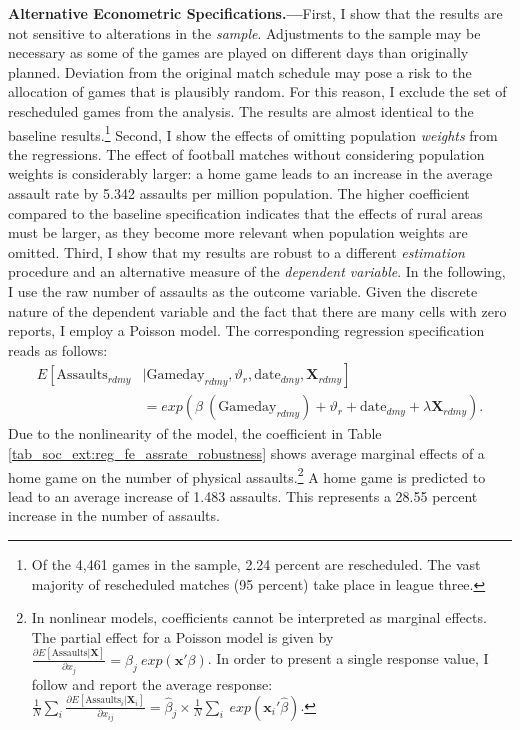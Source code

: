\textbf{Alternative Econometric Specifications.---}First, I show that the results are not sensitive to alterations in the \textit{sample}. Adjustments to the sample may be necessary as some of the games are played on different days than originally planned. Deviation from the original match schedule may pose a risk to the allocation of games that is plausibly random. For this reason, I exclude the set of rescheduled games from the analysis. The results are almost identical to the baseline results.\footnote{Of the 4,461 games in the sample, 2.24 percent are rescheduled. The vast majority of rescheduled matches (95 percent) take place in league three.} Second, I show the effects of omitting population \textit{weights} from the regressions. The effect of football matches without considering population weights is considerably larger: a home game leads to an increase in the average assault rate by 5.342 assaults per million population. The higher coefficient compared to the baseline specification indicates that the effects of rural areas must be larger, as they become more relevant when population weights are omitted. Third, I show that my results are robust to a different \textit{estimation} procedure and an alternative measure of the \textit{dependent variable}. In the following, I use the raw number of assaults as the outcome variable. Given the discrete nature of the dependent variable and the fact that there are many cells with zero reports, I employ a Poisson model. The corresponding regression specification reads as follows:
\begin{align}
E\left[ \text{Assaults}_{rdmy}\right.&|\left.\text{Gameday}_{rdmy},\vartheta_r,\text{date}_{dmy}, \mathbf{X}_{rdmy} \right] \nonumber \\ &= exp\left( \beta\ (\text{Gameday}_{rdmy}) + \vartheta_r + \text{date}_{dmy} + \lambda\mathbf{X}_{rdmy} \right). 
\label{eq_soc_ext:poisson_model}
\end{align}
Due to the nonlinearity of the model, the coefficient in Table \ref{tab_soc_ext:reg_fe_assrate_robustness} shows average marginal effects of a home game on the number of physical assaults.\footnote{In nonlinear models, coefficients cannot be interpreted as marginal effects. The partial effect for a Poisson model is given by $\frac{\partial E\left[ \text{Assaults}| \mathbf{X}\right]}{\partial x_j} = \beta_j\ exp(\mathbf{x'}\beta)$. In order to present a single response value, I follow \cite{cameron2005microeconometrics} and report the average response: $\frac{1}{N}\sum_i \frac{\partial E\left[ \text{Assaults}_i| \mathbf{X}_i\right]}{\partial x_{ij}} = \hat\beta_j \times \frac{1}{N} \sum_i\ exp(\mathbf{x}_i'\hat\beta)$.} A home game is predicted to lead to an average increase of 1.483 assaults. This represents a 28.55 percent increase in the number of assaults. \newline

